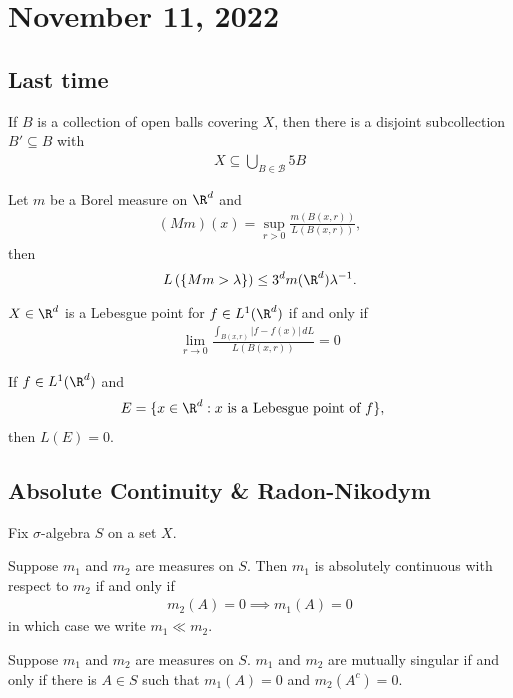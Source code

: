 \section{November 11, 2022}

\subsection*{Last time}

\begin{theorem}[Vitali]
	If $B$ is a collection of open balls covering $X$, then there is a disjoint subcollection $B' \subseteq B$ with
	\begin{align*}
		X \subseteq \bigcup_{B \in \mathcal{B}} 5 B
	\end{align*}
\end{theorem}

\begin{theorem}
	Let $m$ be a Borel measure on $\R^{d}$ and
	\begin{align*}
		(M m )(x) = \sup_{r > 0} \frac{m (B(x, r))}{L (B(x,r))},
	\end{align*}
  then
  \[
		L\left( \{ M m > \lambda \} \right) \leq 3^{d} m (\R^d) \lambda^{-1}.
  \]
\end{theorem}

\begin{definition}
	$X \in \R^{d}$ is a Lebesgue point for $f \in L^{1} ( \R^{d} )$ if and only if
	\begin{align*}
		\lim_{r \to 0} \frac{\int_{B(x, r)} | f - f(x) | \, dL}{L (B(x, r))} = 0
	\end{align*}
\end{definition}

\begin{definition}
	If $f \in L^{1}( \R^{d})$ and
	\begin{align*}
		&E = \{ x \in \R^{d} : x \text{ is a Lebesgue point of } f \},
	\end{align*}
	then $L(E) = 0$.
\end{definition}


\subsection{Absolute Continuity \& Radon-Nikodym}

Fix $\sigma$-algebra $S$ on a set $X$.

\begin{definition}
	Suppose $m_1$ and $m_{2}$ are measures on $S$. Then $m_1$ is absolutely continuous with respect to $m_{2}$ if and only if
	\begin{align*}
		m_{2} (A) = 0 \implies m_1 (A) = 0
	\end{align*} in which case we write $m_1 \ll m_2$.
\end{definition}
\begin{definition}
	Suppose $m_1$ and $m_2$ are measures on $S$. $m_1$ and $m_2$ are mutually singular if and only if there is $A \in S$ such that $m_1(A) = 0$ and $m_2(A^c) = 0$.
\end{definition}

